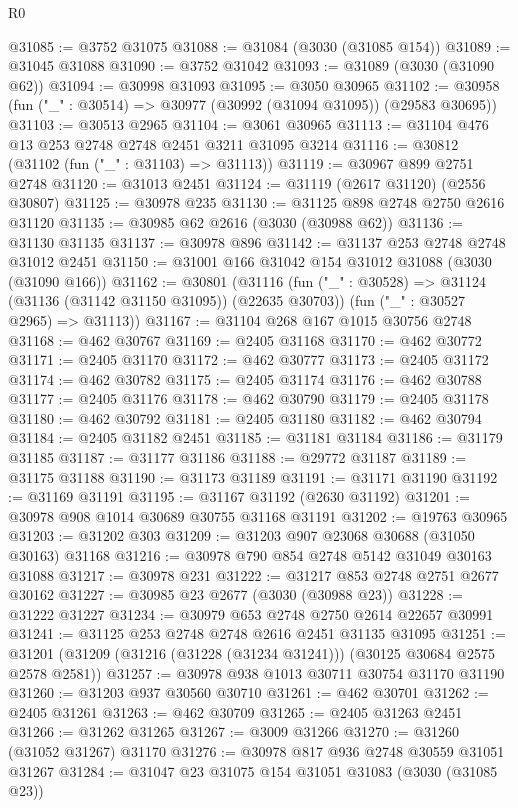 \begin{lexlean}{R0}
\begin{coremodule}
@31085 := @3752 @31075
@31088 := @31084 (@3030 (@31085 @154))
@31089 := @31045 @31088
@31090 := @3752 @31042
@31093 := @31089 (@3030 (@31090 @62))
@31094 := @30998 @31093
@31095 := @3050 @30965
@31102 := @30958 (fun ("_" : @30514) => @30977 (@30992 (@31094 @31095)) (@29583 @30695))
@31103 := @30513 @2965
@31104 := @3061 @30965
@31113 := @31104 @476 @13 @253 @2748 @2748 @2451 @3211 @31095 @3214
@31116 := @30812 (@31102 (fun ("_" : @31103) => @31113))
@31119 := @30967 @899 @2751 @2748
@31120 := @31013 @2451
@31124 := @31119 (@2617 @31120) (@2556 @30807)
@31125 := @30978 @235
@31130 := @31125 @898 @2748 @2750 @2616 @31120
@31135 := @30985 @62 @2616 (@3030 (@30988 @62))
@31136 := @31130 @31135
@31137 := @30978 @896
@31142 := @31137 @253 @2748 @2748 @31012 @2451
@31150 := @31001 @166 @31042 @154 @31012 @31088 (@3030 (@31090 @166))
@31162 := @30801
    (@31116
      (fun ("_" : @30528) => @31124 (@31136 (@31142 @31150 @31095)) (@22635 @30703))
      (fun ("_" : @30527 @2965) => @31113))
@31167 := @31104 @268 @167 @1015 @30756 @2748
@31168 := @462 @30767
@31169 := @2405 @31168
@31170 := @462 @30772
@31171 := @2405 @31170
@31172 := @462 @30777
@31173 := @2405 @31172
@31174 := @462 @30782
@31175 := @2405 @31174
@31176 := @462 @30788
@31177 := @2405 @31176
@31178 := @462 @30790
@31179 := @2405 @31178
@31180 := @462 @30792
@31181 := @2405 @31180
@31182 := @462 @30794
@31184 := @2405 @31182 @2451
@31185 := @31181 @31184
@31186 := @31179 @31185
@31187 := @31177 @31186
@31188 := @29772 @31187
@31189 := @31175 @31188
@31190 := @31173 @31189
@31191 := @31171 @31190
@31192 := @31169 @31191
@31195 := @31167 @31192 (@2630 @31192)
@31201 := @30978 @908 @1014 @30689 @30755 @31168 @31191
@31202 := @19763 @30965
@31203 := @31202 @303
@31209 := @31203 @907 @23068 @30688 (@31050 @30163) @31168
@31216 := @30978 @790 @854 @2748 @5142 @31049 @30163 @31088
@31217 := @30978 @231
@31222 := @31217 @853 @2748 @2751 @2677 @30162
@31227 := @30985 @23 @2677 (@3030 (@30988 @23))
@31228 := @31222 @31227
@31234 := @30979 @653 @2748 @2750 @2614 @22657 @30991
@31241 := @31125 @253 @2748 @2748 @2616 @2451 @31135 @31095
@31251 := @31201 (@31209 (@31216 (@31228 (@31234 @31241))) (@30125 @30684 @2575 @2578 @2581))
@31257 := @30978 @938 @1013 @30711 @30754 @31170 @31190
@31260 := @31203 @937 @30560 @30710
@31261 := @462 @30701
@31262 := @2405 @31261
@31263 := @462 @30709
@31265 := @2405 @31263 @2451
@31266 := @31262 @31265
@31267 := @3009 @31266
@31270 := @31260 (@31052 @31267) @31170
@31276 := @30978 @817 @936 @2748 @30559 @31051 @31267
@31284 := @31047 @23 @31075 @154 @31051 @31083 (@3030 (@31085 @23))

\end{coremodule}
\end{lexlean}
